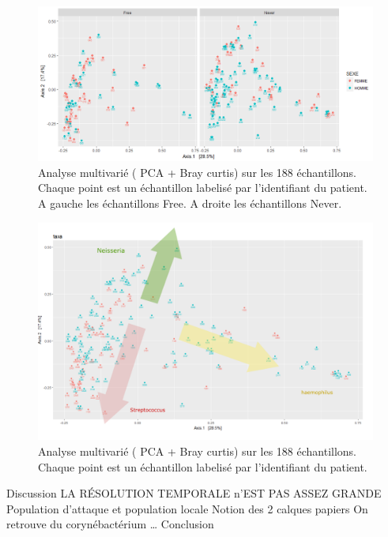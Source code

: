 \documentclass[12pt,a4paper]{article}
\begin{document}
\begin{figure}
\begin{center}
\includegraphics[scale=0.60]{img/oordination_new.png}\hfill
\end{center}
\caption{Analyse multivarié ( PCA + Bray curtis) sur les 188 échantillons. Chaque point est un échantillon labelisé par l'identifiant du patient. A gauche les échantillons Free. A droite les échantillons Never. }
\label{ordination}
\end{figure}

\begin{figure}
\begin{center}
\includegraphics[scale=0.40]{img/Capture.png}\hfill
\end{center}
\caption{Analyse multivarié ( PCA + Bray curtis) sur les 188 échantillons. Chaque point est un échantillon labelisé par l'identifiant du patient.}
\label{ordination2}
\end{figure}


Discussion
LA RÉSOLUTION TEMPORALE n’EST PAS ASSEZ GRANDE
Population d’attaque et population locale
Notion des 2 calques papiers
On retrouve du corynébactérium …
Conclusion
\end{document}
